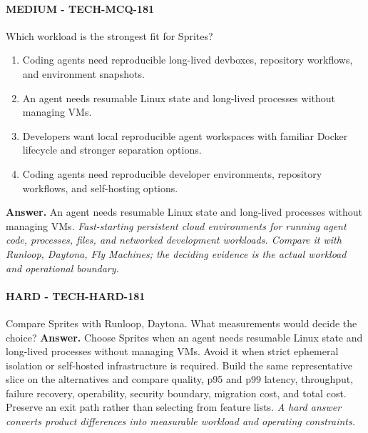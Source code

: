 \paragraph{MEDIUM - TECH-MCQ-181} Which workload is the strongest fit for Sprites?
\begin{enumerate}[label=\Alph*.]
\item Coding agents need reproducible long-lived devboxes, repository workflows, and environment snapshots.
\item An agent needs resumable Linux state and long-lived processes without managing VMs.
\item Developers want local reproducible agent workspaces with familiar Docker lifecycle and stronger separation options.
\item Coding agents need reproducible developer environments, repository workflows, and self-hosting options.
\end{enumerate}
\textbf{Answer.} An agent needs resumable Linux state and long-lived processes without managing VMs.
\textit{Fast-starting persistent cloud environments for running agent code, processes, files, and networked development workloads. Compare it with Runloop, Daytona, Fly Machines; the deciding evidence is the actual workload and operational boundary.}
\paragraph{HARD - TECH-HARD-181} Compare Sprites with Runloop, Daytona. What measurements would decide the choice?
\textbf{Answer.} Choose Sprites when an agent needs resumable Linux state and long-lived processes without managing VMs. Avoid it when strict ephemeral isolation or self-hosted infrastructure is required. Build the same representative slice on the alternatives and compare quality, p95 and p99 latency, throughput, failure recovery, operability, security boundary, migration cost, and total cost. Preserve an exit path rather than selecting from feature lists.
\textit{A hard answer converts product differences into measurable workload and operating constraints.}
